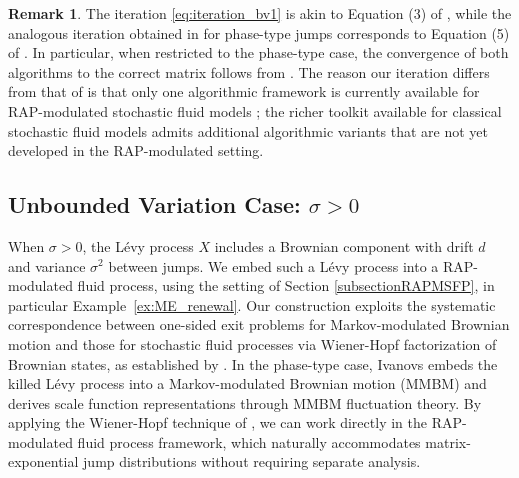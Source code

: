 \documentclass[a4paper,11pt]{article}
\numberwithin{equation}{section}
\theoremstyle{plain}
\theoremstyle{definition}
\newtheorem{remark}[theorem]{Remark}
\newcommand{\1}{\mathbf{1}}
\begin{document}
\begin{remark}\label{rem:bv_iteration_diff}
The iteration \eqref{eq:iteration_bv1} is akin to Equation (3) of \cite{bean2005algorithms}, while the analogous iteration obtained in \cite[Section 4.2]{Ivanovs2021} for phase-type jumps corresponds to Equation (5) of \cite{bean2005algorithms}. In particular, when restricted to the phase-type case, the convergence of both algorithms to the correct matrix follows from \cite{bean2005algorithms}. The reason our iteration differs from that of \cite[Section 4.2]{Ivanovs2021} is that only one algorithmic framework is currently available for RAP-modulated stochastic fluid models \cite{BeanNguyenNielsenPeralta2022}; the richer toolkit available for classical stochastic fluid models admits additional algorithmic variants that are not yet developed in the RAP-modulated setting.
\end{remark}


\subsection{Unbounded Variation Case: $\sigma > 0$}

When $\sigma > 0$, the Lévy process $X$ includes a Brownian component with drift $d$ and variance $\sigma^2$ between jumps. 
We embed such a L\'evy process into a RAP-modulated fluid process, using the setting of Section \ref{subsectionRAPMSFP}, in particular Example~\ref{ex:ME_renewal}. 
Our construction exploits the systematic correspondence between one-sided exit problems for Markov-modulated Brownian motion and those for stochastic fluid processes via Wiener-Hopf factorization of Brownian states, as established by \cite{NguyenPeralta2019}. In the phase-type case, Ivanovs embeds the killed Lévy process into a Markov-modulated Brownian motion (MMBM) and derives scale function representations through MMBM fluctuation theory. By applying the Wiener-Hopf technique of \cite{NguyenPeralta2019}, we can work directly in the RAP-modulated fluid process framework, which naturally accommodates matrix-exponential jump distributions without requiring separate analysis.
\end{document}

